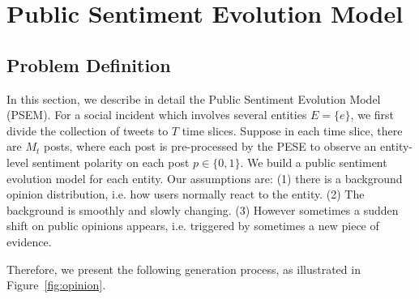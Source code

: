 \documentclass[runningheads]{llncs}
\begin{document}
\section{Public Sentiment Evolution Model}\label{sec:public opinion model}
\subsection{Problem Definition}
In this section, we describe in detail the Public Sentiment Evolution Model (PSEM). For a social incident which involves several entities $E=\{e\}$, we first divide the collection of tweets to $T$ time slices. %
Suppose in each time slice, there are $M_t$ posts, where each post is pre-processed by the PESE to observe an entity-level sentiment polarity on each post $p\in \{0,1\}$. 
We build a public sentiment evolution model for each entity.
Our assumptions are: (1) there is a background opinion distribution, i.e. how users normally react to the entity. 
(2) The background is smoothly and slowly changing. 
(3) However sometimes a sudden shift on public opinions appears, i.e. triggered by sometimes a new piece of evidence.  

Therefore, we present the following generation process, as illustrated in Figure~\ref{fig:opinion}.
\end{document}
